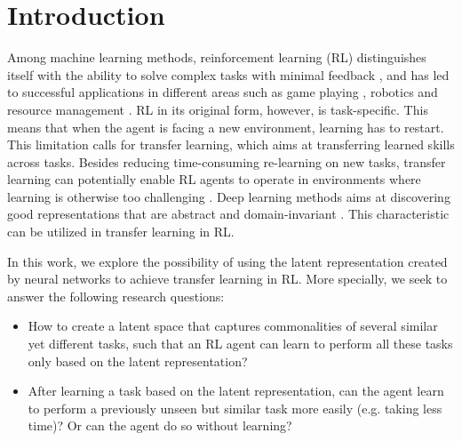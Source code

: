 \section{Introduction}
\label{sec:introduction}
Among machine learning methods, reinforcement learning (RL) distinguishes itself with the ability to solve complex tasks with minimal feedback \citep{taylor2007cross}, and has led to successful applications 
in different areas such as game playing \citep{silver2016mastering}, robotics \citep{levine2016end} and resource management \citep{mao2016resource}. 
RL in its original form, however, is task-specific.
This means that when the agent is facing a new environment, learning has to restart.
This limitation calls for transfer learning, which aims at transferring learned skills across tasks.
Besides reducing time-consuming re-learning on new tasks, transfer learning can potentially enable RL agents to operate in environments where learning is otherwise too challenging \citep{barreto2018transfer}.
Deep learning methods aims at discovering good representations that are abstract and domain-invariant \citep{bengio2012deep,ganin2014unsupervised}.
This characteristic can be utilized in transfer learning in RL.

In this work, we explore the possibility of using the latent representation created by neural networks to achieve transfer learning in RL.
More specially, we seek to answer the following research questions:
\begin{itemize}
	\item How to create a latent space that captures commonalities of several similar yet different tasks, such that an RL agent can learn to perform all these tasks only based on the latent representation?
	\item After learning a task based on the latent representation, can the agent learn to perform a previously unseen but similar task more easily (e.g. taking less time)? Or can the agent do so without learning?
\end{itemize}






